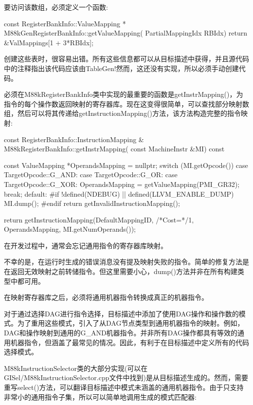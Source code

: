 要访问该数组，必须定义一个函数:

\begin{cpp}
const RegisterBankInfo::ValueMapping *
M88kGenRegisterBankInfo::getValueMapping(
        PartialMappingIdx RBIdx) {
    return &ValMappings[1 + 3*RBIdx];
}
\end{cpp}

创建这些表时，很容易出错。所有这些信息都可以从目标描述中获得，并且源代码中的注释指出该代码应该由TableGen!然而，这还没有实现，所以必须手动创建代码。

必须在M88kRegisterBankInfo类中实现的最重要的函数是getInstrMapping()，为指令的每个操作数返回映射的寄存器库。现在这变得很简单，可以查找部分映射数组，然后可以将其传递给getInstructionMapping()方法，该方法构造完整的指令映射:

\begin{cpp}
const RegisterBankInfo::InstructionMapping &
M88kRegisterBankInfo::getInstrMapping(
        const MachineInstr &MI) const {
    const ValueMapping *OperandsMapping = nullptr;
    switch (MI.getOpcode()) {
    case TargetOpcode::G_AND:
    case TargetOpcode::G_OR:
    case TargetOpcode::G_XOR:
        OperandsMapping = getValueMapping(PMI_GR32);
        break;
    default:
#if !defined(NDEBUG) || defined(LLVM_ENABLE_DUMP)
        MI.dump();
#endif
        return getInvalidInstructionMapping();
    }

    return getInstructionMapping(DefaultMappingID, /*Cost=*/1,
                                 OperandsMapping,
                                 MI.getNumOperands());
}
\end{cpp}

在开发过程中，通常会忘记通用指令的寄存器库映射。

不幸的是，在运行时生成的错误消息没有提及映射失败的指令。简单的修复方法是在返回无效映射之前转储指令。但这里需要小心，dump()方法并非在所有构建类型中都可用。

在映射寄存器库之后，必须将通用机器指令转换成真正的机器指令。


对于通过选择DAG进行指令选择，目标描述中添加了使用DAG操作和操作数的模式。为了重用这些模式，引入了从DAG节点类型到通用机器指令的映射。例如，DAG和操作映射到通用的G\_AND机器指令。并非所有DAG操作都具有等效的通用机器指令，但涵盖了最常见的情况。因此，有利于在目标描述中定义所有的代码选择模式。

M88kInstructionSelector类的大部分实现(可以在GISel/M88kInstructionSelector.cpp文件中找到)是从目标描述生成的。然而，需要重写select()方法，可以翻译目标描述中模式未涵盖的通用机器指令。由于只支持非常小的通用指令子集，所以可以简单地调用生成的模式匹配器:

